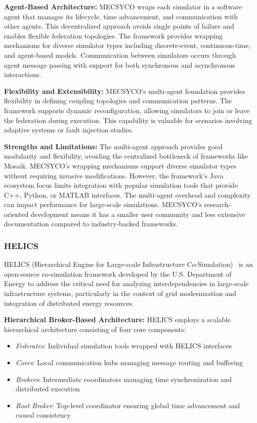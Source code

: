 \textbf{Agent-Based Architecture:} MECSYCO wraps each simulator in a software agent that manages its lifecycle, time advancement, and communication with other agents. This decentralized approach avoids single points of failure and enables flexible federation topologies. The framework provides wrapping mechanisms for diverse simulator types including discrete-event, continuous-time, and agent-based models. Communication between simulators occurs through agent message passing with support for both synchronous and asynchronous interactions.

\textbf{Flexibility and Extensibility:} MECSYCO's multi-agent foundation provides flexibility in defining coupling topologies and communication patterns. The framework supports dynamic reconfiguration, allowing simulators to join or leave the federation during execution. This capability is valuable for scenarios involving adaptive systems or fault injection studies.

\textbf{Strengths and Limitations:} The multi-agent approach provides good modularity and flexibility, avoiding the centralized bottleneck of frameworks like Mosaik. MECSYCO's wrapping mechanisms support diverse simulator types without requiring invasive modifications. However, the framework's Java ecosystem focus limits integration with popular simulation tools that provide C++, Python, or MATLAB interfaces. The multi-agent overhead and complexity can impact performance for large-scale simulations. MECSYCO's research-oriented development means it has a smaller user community and less extensive documentation compared to industry-backed frameworks.


\subsubsection{HELICS}

HELICS (Hierarchical Engine for Large-scale Infrastructure Co-Simulation)~\cite{helics} is an open-source co-simulation framework developed by the U.S. Department of Energy to address the critical need for analyzing interdependencies in large-scale infrastructure systems, particularly in the context of grid modernization and integration of distributed energy resources.

\textbf{Hierarchical Broker-Based Architecture:} HELICS employs a scalable hierarchical architecture consisting of four core components:

\begin{itemize}
    \item \textit{Federates}: Individual simulation tools wrapped with HELICS interfaces
    \item \textit{Cores}: Local communication hubs managing message routing and buffering
    \item \textit{Brokers}: Intermediate coordinators managing time synchronization and distributed execution
    \item \textit{Root Broker}: Top-level coordinator ensuring global time advancement and causal consistency
\end{itemize}

